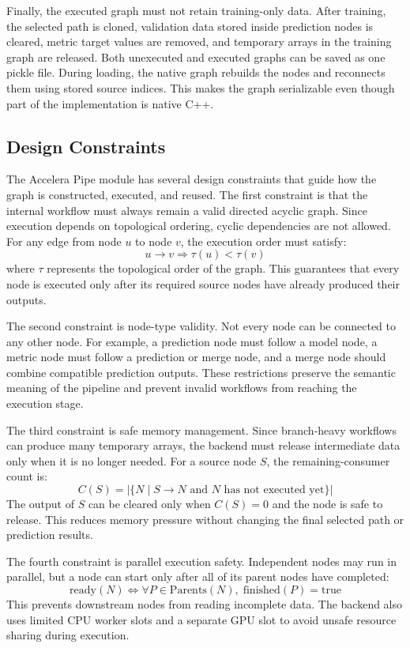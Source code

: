 \documentclass[12pt,a4paper,oneside]{report}
\begin{document}
Finally, the executed graph must not retain training-only data. After training,
the selected path is cloned, validation data stored inside prediction nodes is
cleared, metric target values are removed, and temporary arrays in the training
graph are released. Both unexecuted and executed graphs can be saved as one
pickle file. During loading, the native graph rebuilds the nodes and reconnects
them using stored source indices. This makes the graph serializable even though
part of the implementation is native C++.


\subsection{Design Constraints}

The Accelera Pipe module has several design constraints that guide how the graph
is constructed, executed, and reused. The first constraint is that the internal
workflow must always remain a valid directed acyclic graph. Since execution
depends on topological ordering, cyclic dependencies are not allowed. For any
edge from node \(u\) to node \(v\), the execution order must satisfy:
\[
u \rightarrow v \Rightarrow \tau(u) < \tau(v)
\]
where \(\tau\) represents the topological order of the graph. This guarantees
that every node is executed only after its required source nodes have already
produced their outputs.

The second constraint is node-type validity. Not every node can be connected to
any other node. For example, a prediction node must follow a model node, a metric
node must follow a prediction or merge node, and a merge node should combine
compatible prediction outputs. These restrictions preserve the semantic meaning
of the pipeline and prevent invalid workflows from reaching the execution stage.

The third constraint is safe memory management. Since branch-heavy workflows can
produce many temporary arrays, the backend must release intermediate data only
when it is no longer needed. For a source node \(S\), the remaining-consumer
count is:
\[
C(S) = |\{N \mid S \rightarrow N \text{ and } N \text{ has not executed yet}\}|
\]
The output of \(S\) can be cleared only when \(C(S)=0\) and the node is safe to
release. This reduces memory pressure without changing the final selected path
or prediction results.

The fourth constraint is parallel execution safety. Independent nodes may run in
parallel, but a node can start only after all of its parent nodes have completed:
\[
\text{ready}(N) \Longleftrightarrow \forall P \in \text{Parents}(N),\;
\text{finished}(P)=\text{true}
\]
This prevents downstream nodes from reading incomplete data. The backend also
uses limited CPU worker slots and a separate GPU slot to avoid unsafe resource
sharing during execution.
\end{document}
